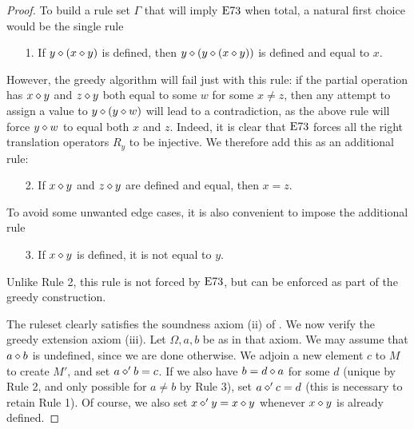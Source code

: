 \begin{proof} To build a rule set $\Gamma$ that will imply $\mathrm{E}73$ when total, a natural first choice would be the single rule
\begin{itemize}
\item[1.] If $y \diamond (x \diamond y)$ is defined, then $y \diamond (y \diamond (x \diamond y))$ is defined and equal to $x$.
\end{itemize}
However, the greedy algorithm will fail just with this rule: if the partial operation has $x \diamond y$ and $z \diamond y$ both equal to some $w$ for some $x \neq z$, then any attempt to assign a value to $y \diamond (y \diamond w)$ will lead to a contradiction, as the above rule will force $y \diamond w$ to equal both $x$ and $z$.  Indeed, it is clear that $\mathrm{E}73$ forces all the right translation operators $R_y$ to be injective.  We therefore add this as an additional rule:
\begin{itemize}
\item[2.] If $x \diamond y$ and $z \diamond y$ are defined and equal, then $x=z$.
\end{itemize}
To avoid some unwanted edge cases, it is also convenient to impose the additional rule
\begin{itemize}
  \item[3.] If $x \diamond y$ is defined, it is not equal to $y$.
\end{itemize}
Unlike Rule 2, this rule is not forced by $\mathrm{E}73$, but can be enforced as part of the greedy construction.

The ruleset clearly satisfies the soundness axiom (ii) of .  We now verify the greedy extension axiom (iii).  Let $\Omega,a,b$ be as in that axiom. We may assume that $a \diamond b$ is undefined, since we are done otherwise. We adjoin a new element $c$ to $M$ to create $M'$, and set $a \diamond' b = c$.  If we also have $b = d \diamond a$ for some $d$ (unique by Rule 2, and only possible for $a \neq b$ by Rule 3), set $a \diamond' c = d$ (this is necessary to retain Rule 1).  Of course, we also set $x \diamond' y = x \diamond y$ whenever $x \diamond y$ is already defined.


\end{proof}
